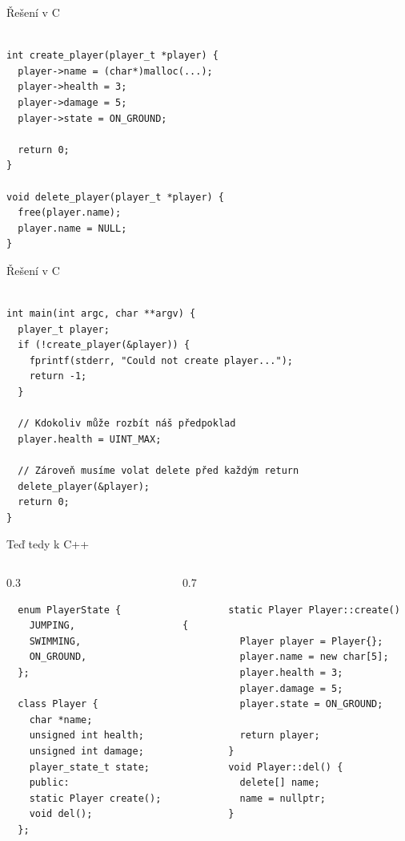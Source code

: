 \documentclass[aspectratio=1610]{beamer}
\begin{document}
\begin{frame}[fragile]{Řešení v C}

\begin{verbatim}

int create_player(player_t *player) {
  player->name = (char*)malloc(...);
  player->health = 3;
  player->damage = 5;
  player->state = ON_GROUND;

  return 0;
}

void delete_player(player_t *player) {
  free(player.name);
  player.name = NULL;
}

\end{verbatim}

\end{frame}


\begin{frame}[fragile]{Řešení v C}

\begin{verbatim}

int main(int argc, char **argv) {
  player_t player;
  if (!create_player(&player)) {
    fprintf(stderr, "Could not create player...");
    return -1;
  }

  // Kdokoliv může rozbít náš předpoklad
  player.health = UINT_MAX;

  // Zároveň musíme volat delete před každým return
  delete_player(&player);
  return 0;
}

\end{verbatim}

\end{frame}

\begin{frame}[fragile]{Teď tedy k C++}

\begin{columns}
  \begin{column}{0.3\textwidth}
  \begin{verbatim}
  enum PlayerState {
    JUMPING,
    SWIMMING,
    ON_GROUND,
  };

  class Player {
    char *name;
    unsigned int health;
    unsigned int damage;
    player_state_t state;
    public:
    static Player create(); 
    void del();
  };
  \end{verbatim}
  \end{column}

  \begin{column}{0.7\textwidth}


    \begin{verbatim}
        static Player Player::create() {
          Player player = Player{};
          player.name = new char[5];
          player.health = 3;
          player.damage = 5;
          player.state = ON_GROUND;

          return player;
        }
        void Player::del() {
          delete[] name;
          name = nullptr;
        }
      \end{verbatim}
  \end{column}
\end{columns}

\end{frame}
\end{document}
